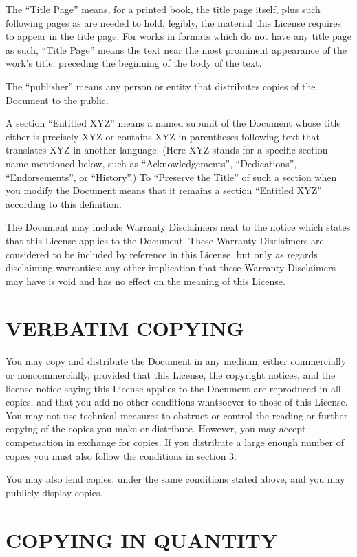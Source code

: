 The “Title Page” means, for a printed book, the title
page itself, plus such following pages as are needed to hold,
legibly, the material this License requires to appear in the
title page. For works in formats which do not have any title
page as such, “Title Page” means the text near the most
prominent appearance of the work’s title, preceding the
beginning of the body of the text.

The “publisher” means any person or entity that distributes
copies of the Document to the public.

A section “Entitled XYZ” means a named subunit of the
Document whose title either is precisely XYZ or contains
XYZ in parentheses following text that translates XYZ in
another language. (Here XYZ stands for a specific section
name mentioned below, such as “Acknowledgements”,
“Dedications”, “Endorsements”, or “History”.) To
“Preserve the Title” of such a section when you modify
the Document means that it remains a section “Entitled
XYZ” according to this definition.

The Document may include Warranty Disclaimers next to
the notice which states that this License applies to the
Document. These Warranty Disclaimers are considered to be
included by reference in this License, but only as regards
disclaiming warranties: any other implication that these
Warranty Disclaimers may have is void and has no effect on
the meaning of this License.

\section{VERBATIM COPYING}
You may copy and distribute the Document in any medium, either
commercially or noncommercially, provided that this License,
the copyright notices, and the license notice saying this
License applies to the Document are reproduced in all copies,
and that you add no other conditions whatsoever to those of
this License. You may not use technical measures to obstruct
or control the reading or further copying of the copies you
make or distribute. However, you may accept compensation in
exchange for copies. If you distribute a large enough number
of copies you must also follow the conditions in section 3.

You may also lend copies, under the same conditions stated
above, and you may publicly display copies.


\section{COPYING IN QUANTITY}

